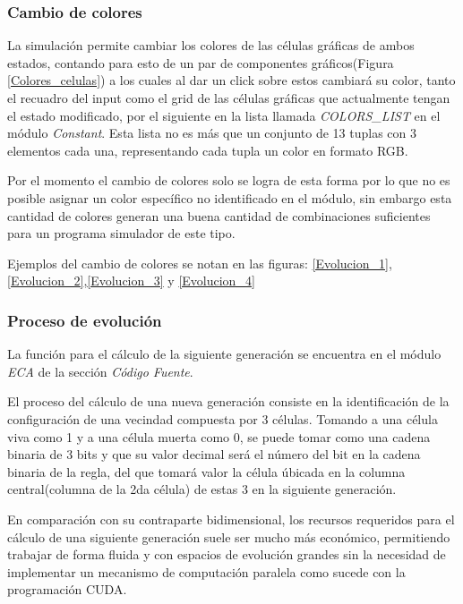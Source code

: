 \documentclass[]{article}
\begin{document}
			\newpage
			\subsubsection{Cambio de colores}
				\justifying
				La simulación permite cambiar los colores de las células gráficas de ambos estados, contando para esto de un par de componentes gráficos(Figura \ref{Colores_celulas}) a los cuales al dar un click sobre estos cambiará su color, tanto el recuadro del input como el grid de las células gráficas que actualmente tengan el estado modificado, por el siguiente en la lista llamada \textit{COLORS\_LIST} en el módulo \textit{Constant}. Esta lista no es más que un conjunto de 13 tuplas con 3 elementos cada una, representando cada tupla un color en formato RGB.
				
				\hfill\break
				\justifying
				Por el momento el cambio de colores solo se logra de esta forma por lo que no es posible asignar un color específico no identificado en el módulo, sin embargo esta cantidad de colores generan una buena cantidad de combinaciones suficientes para un programa simulador de este tipo.
				
				\hfill\break
				\justifying
				Ejemplos del cambio de colores se notan en las figuras: \ref{Evolucion_1},\ref{Evolucion_2},\ref{Evolucion_3} y \ref{Evolucion_4}
				
				
			\newpage
			\subsubsection{Proceso de evolución}
				\justifying
				La función para el cálculo de la siguiente generación se encuentra en el módulo \textit{ECA} de la sección \textit{Código Fuente}.
				
				\hfill\break
				\justifying
				El proceso del cálculo de una nueva generación consiste en la identificación de la configuración de una vecindad compuesta por 3 células. Tomando a una célula viva como 1 y a una célula muerta como 0, se puede tomar como una cadena binaria de 3 bits y que su valor decimal será el número del bit en la cadena binaria de la regla, del que tomará valor la célula úbicada en la columna central(columna de la 2da célula) de estas 3 en la siguiente generación.
				
				\hfill\break
				\justifying
				En comparación con su contraparte bidimensional, los recursos requeridos para el cálculo de una siguiente generación suele ser mucho más económico, permitiendo trabajar de forma fluida y con espacios de evolución grandes sin la necesidad de implementar un mecanismo de computación paralela como sucede con la programación CUDA.
				
\end{document}
